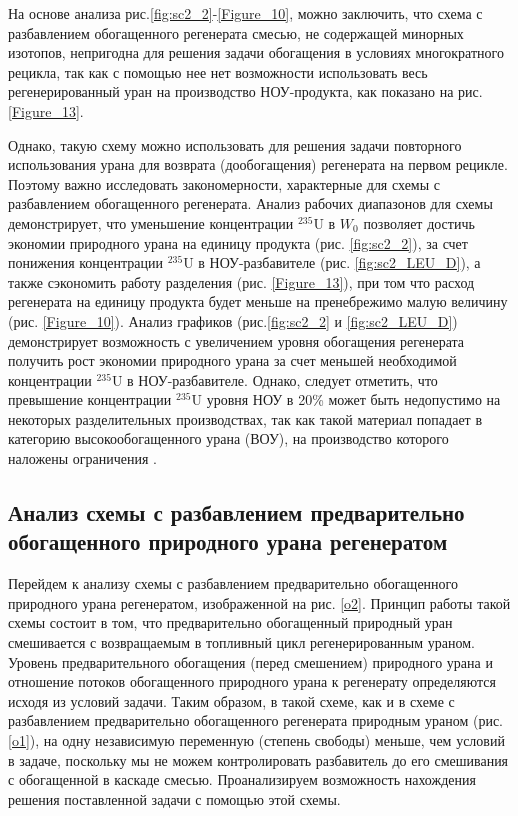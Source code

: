На основе анализа рис.\ref{fig:sc2_2}-\ref{Figure_10}, можно заключить, что схема с разбавлением обогащенного регенерата смесью, не содержащей минорных изотопов, непригодна для решения задачи обогащения в условиях многократного рецикла, так как с помощью нее нет возможности использовать весь регенерированный уран на производство НОУ-продукта, как показано на рис. \ref{Figure_13}.

Однако, такую схему можно использовать для решения задачи повторного использования урана для возврата (дообогащения) регенерата на первом рецикле. Поэтому важно исследовать закономерности, характерные для схемы с разбавлением обогащенного регенерата.
Анализ рабочих диапазонов для схемы демонстрирует, что уменьшение концентрации $^{235}$U в $W_0$ позволяет достичь экономии природного урана на единицу продукта (рис. \ref{fig:sc2_2}), за счет понижения концентрации $^{235}$U в НОУ-разбавителе (рис. \ref{fig:sc2_LEU_D}), а также сэкономить работу разделения (рис. \ref{Figure_13}), при том что расход регенерата на единицу продукта будет меньше на пренебрежимо малую величину (рис. \ref{Figure_10}). Анализ графиков (рис.\ref{fig:sc2_2} и \ref{fig:sc2_LEU_D}) демонстрирует возможность с увеличением уровня обогащения регенерата получить рост экономии природного урана за счет меньшей необходимой концентрации $^{235}$U в НОУ-разбавителе. Однако, следует отметить, что превышение концентрации $^{235}$U уровня НОУ в 20\% может быть недопустимо на некоторых разделительных производствах, так как такой материал попадает в категорию высокообогащенного урана (ВОУ), на производство которого наложены ограничения \cite{gusevProliferationResistanceAnalysis2019}.


\subsection{Анализ схемы с разбавлением предварительно обогащенного природного урана регенератом}

Перейдем к анализу схемы с разбавлением предварительно обогащенного природного урана регенератом, изображенной на рис. \ref{o2}. Принцип работы такой схемы состоит в том, что предварительно обогащенный природный уран смешивается с возвращаемым в топливный цикл регенерированным ураном. Уровень предварительного обогащения (перед смешением) природного урана и отношение потоков обогащенного природного урана к регенерату определяются исходя из условий задачи. Таким образом, в такой схеме, как и в схеме с разбавлением предварительно обогащенного регенерата природным ураном (рис. \ref{o1}), на одну независимую переменную (степень свободы) меньше, чем условий в задаче, поскольку мы не можем контролировать разбавитель до его смешивания с обогащенной в каскаде смесью. Проанализируем возможность нахождения решения поставленной задачи с помощью этой схемы.


